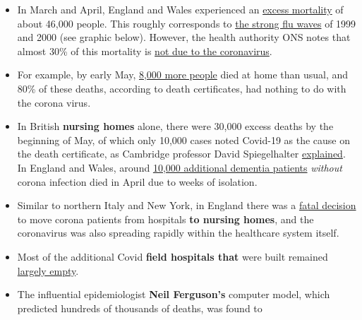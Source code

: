 \begin{itemize}
\tightlist
\item
  In March and April, England and Wales experienced an
  \href{https://www.ons.gov.uk/peoplepopulationandcommunity/birthsdeathsandmarriages/deaths/articles/analysisofdeathregistrationsnotinvolvingcoronaviruscovid19englandandwales28december2019to1may2020/technicalannex}{excess
  mortality} of about 46,000 people. This roughly corresponds to
  \href{https://off-guardian.org/2020/05/25/were-all-in-the-big-numbers-now/}{the
  strong flu waves} of 1999 and 2000 (see graphic below). However, the
  health authority ONS notes that almost 30\% of this mortality is
  \href{https://www.ons.gov.uk/peoplepopulationandcommunity/birthsdeathsandmarriages/deaths/articles/analysisofdeathregistrationsnotinvolvingcoronaviruscovid19englandandwales28december2019to1may2020/technicalannex}{not
  due to the coronavirus}.
\item
  For example, by early May,
  \href{https://www.theguardian.com/society/2020/may/08/more-people-dying-at-home-during-covid-19-pandemic-uk-analysis}{8,000
  more people} died at home than usual, and 80\% of these deaths,
  according to death certificates, had nothing to do with the corona
  virus.
\item
  In British \textbf{nursing homes} alone, there were 30,000 excess
  deaths by the beginning of May, of which only 10,000 cases noted
  Covid-19 as the cause on the death certificate, as Cambridge professor
  David Spiegelhalter
  \href{https://www.bmj.com/content/369/bmj.m1931}{explained}. In
  England and Wales, around
  \href{https://www.theguardian.com/world/2020/jun/05/covid-19-causing-10000-dementia-deaths-beyond-infections-research-says}{10,000
  additional dementia patients} \emph{without} corona infection died in
  April due to weeks of isolation.
\item
  Similar to northern Italy and New York, in England there was a
  \href{https://drmalcolmkendrick.org/2020/05/11/how-to-make-a-crisis-far-far-worse/}{fatal
  decision} to move corona patients from hospitals \textbf{to nursing
  homes}, and the coronavirus was also spreading rapidly within the
  healthcare system itself.
\item
  Most of the additional Covid \textbf{field hospitals that} were built
  remained
  \href{https://www.telegraph.co.uk/news/0/do-many-nhs-nightingale-hospitals-remain-empty/}{largely
  empty}.
\item
  The influential epidemiologist \textbf{Neil Ferguson's} computer
  model, which predicted hundreds of thousands of deaths, was found to

\end{itemize}
